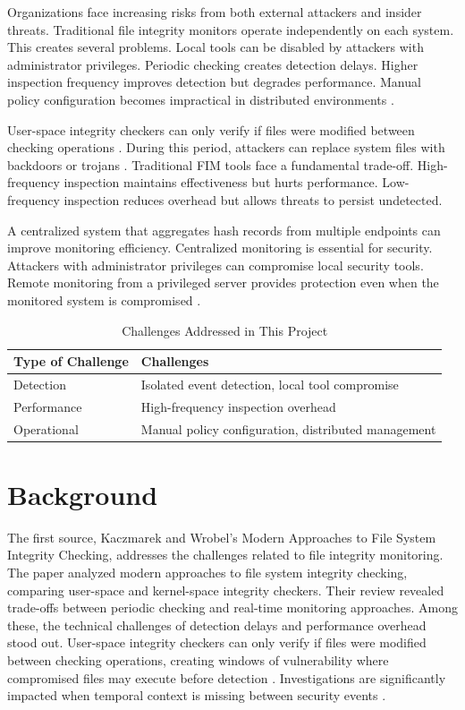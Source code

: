 \documentclass[conference]{IEEEtran}
\begin{document}
Organizations face increasing risks from both external attackers and insider threats. Traditional file integrity monitors operate independently on each system. This creates several problems. Local tools can be disabled by attackers with administrator privileges. Periodic checking creates detection delays. Higher inspection frequency improves detection but degrades performance. Manual policy configuration becomes impractical in distributed environments \cite{abdullah}.

User-space integrity checkers can only verify if files were modified between checking operations \cite{kaczmarek}. During this period, attackers can replace system files with backdoors or trojans \cite{kaczmarek}. Traditional FIM tools face a fundamental trade-off. High-frequency inspection maintains effectiveness but hurts performance. Low-frequency inspection reduces overhead but allows threats to persist undetected.

A centralized system that aggregates hash records from multiple endpoints can improve monitoring efficiency. Centralized monitoring is essential for security. Attackers with administrator privileges can compromise local security tools. Remote monitoring from a privileged server provides protection even when the monitored system is compromised \cite{abdullah}.

\begin{table}[h]
\centering
\caption{Challenges Addressed in This Project}
\begin{tabular}{|p{4cm}|p{4cm}|}
\hline
\textbf{Type of Challenge} & \textbf{Challenges} \\
\hline
Detection & Isolated event detection, local tool compromise \\
\hline
Performance & High-frequency inspection overhead \\
\hline
Operational & Manual policy configuration, distributed management \\
\hline
\end{tabular}
\end{table}

\section{Background}

The first source, Kaczmarek and Wrobel's Modern Approaches to File System Integrity Checking, addresses the challenges related to file integrity monitoring. The paper analyzed modern approaches to file system integrity checking, comparing user-space and kernel-space integrity checkers. Their review revealed trade-offs between periodic checking and real-time monitoring approaches. Among these, the technical challenges of detection delays and performance overhead \cite{kaczmarek} stood out. User-space integrity checkers can only verify if files were modified between checking operations, creating windows of vulnerability where compromised files may execute before detection \cite{kaczmarek}. Investigations are significantly impacted when temporal context is missing between security events \cite{kaczmarek}.
\end{document}
